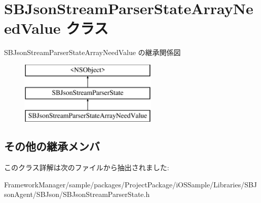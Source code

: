 \hypertarget{interface_s_b_json_stream_parser_state_array_need_value}{}\section{S\+B\+Json\+Stream\+Parser\+State\+Array\+Need\+Value クラス}
\label{interface_s_b_json_stream_parser_state_array_need_value}
S\+B\+Json\+Stream\+Parser\+State\+Array\+Need\+Value の継承関係図\begin{figure}[H]
\begin{center}
\leavevmode
\includegraphics[height=3.000000cm]{interface_s_b_json_stream_parser_state_array_need_value}
\end{center}
\end{figure}
\subsection*{その他の継承メンバ}


このクラス詳解は次のファイルから抽出されました\+:\begin{DoxyCompactItemize}
\item 
Framework\+Manager/sample/packages/\+Project\+Package/i\+O\+S\+Sample/\+Libraries/\+S\+B\+Json\+Agent/\+S\+B\+Json/S\+B\+Json\+Stream\+Parser\+State.\+h\end{DoxyCompactItemize}
